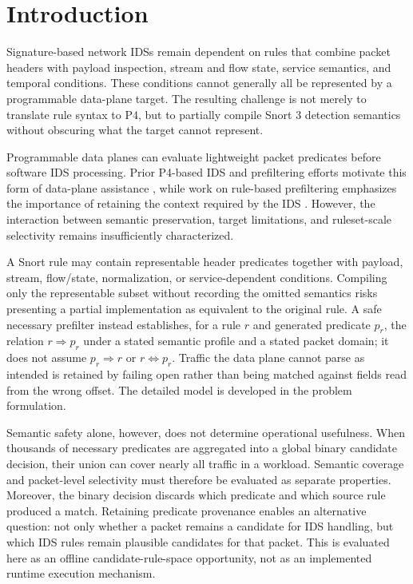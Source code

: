 \documentclass{article}
\begin{document}
\section{Introduction}
Signature-based network IDSs remain dependent on rules that combine packet
headers with payload inspection, stream and flow state, service semantics,
and temporal conditions. These conditions cannot generally all be represented
by a programmable data-plane target. The resulting challenge is not merely
to translate rule syntax to P4, but to partially compile Snort 3 detection
semantics without obscuring what the target cannot represent.

Programmable data planes can evaluate lightweight packet predicates before
software IDS processing. Prior P4-based IDS and prefiltering efforts motivate
this form of data-plane assistance \cite{lewis2019p4id,tavares2021p4onids},
while work on rule-based prefiltering emphasizes the importance of retaining
the context required by the IDS \cite{brum2025rethinking}. However, the
interaction between semantic preservation, target limitations, and
ruleset-scale selectivity remains insufficiently characterized.

A Snort rule may contain representable header predicates together with
payload, stream, flow/state, normalization, or service-dependent conditions.
Compiling only the representable subset without recording the omitted
semantics risks presenting a partial implementation as equivalent to the
original rule. A safe necessary prefilter instead establishes, for a rule
$r$ and generated predicate $p_r$, the relation $r \Rightarrow p_r$ under a
stated semantic profile and a stated packet domain; it does not assume
$p_r \Rightarrow r$ or $r \Leftrightarrow p_r$. Traffic the data plane
cannot parse as intended is retained by failing open rather than being
matched against fields read from the wrong offset. The detailed model is
developed in the problem formulation.

Semantic safety alone, however, does not determine operational usefulness.
When thousands of necessary predicates are aggregated into a global binary
candidate decision, their union can cover nearly all traffic in a workload.
Semantic coverage and packet-level selectivity must therefore be evaluated as
separate properties. Moreover, the binary decision discards which predicate
and which source rule produced a match. Retaining predicate provenance enables
an alternative question: not only whether a packet remains a candidate for
IDS handling, but which IDS rules remain plausible candidates for that packet.
This is evaluated here as an offline candidate-rule-space opportunity, not as
an implemented runtime execution mechanism.
\end{document}
